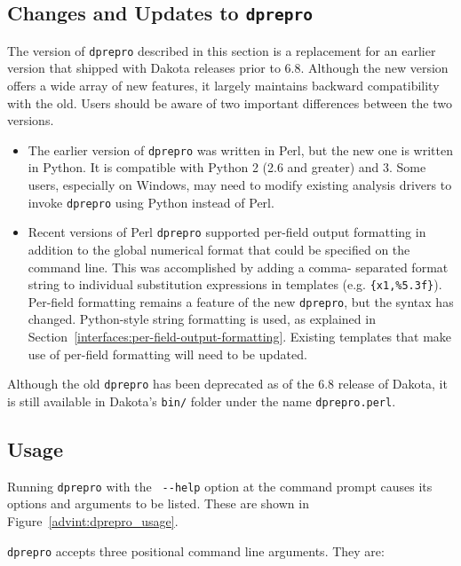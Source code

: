 {\subsection{Changes and Updates to \texttt{dprepro}}\label{interfaces:dprepro-changes}

The version of \texttt{dprepro} described in this section is a replacement for 
an earlier version that shipped with Dakota releases prior to 6.8. Although
the new version offers a wide array of new features, it largely maintains 
backward compatibility with the old. Users should be aware of two important 
differences between the two versions.

\begin{itemize}
 \item The earlier version of \texttt{dprepro} was written in Perl, but the 
	 new one is written in Python. It is compatible with Python 2 (2.6 and 
	 greater) and 3. Some users, especially on Windows, may need to modify 
	 existing analysis drivers to invoke \texttt{dprepro} using Python instead of
	 Perl.
 \item  Recent versions of Perl \texttt{dprepro} supported per-field output
	 formatting in addition to the global numerical format that could be 
	 specified on the command line. This was accomplished by adding a comma-
	 separated format string to individual substitution expressions in 
	 templates (e.g. \texttt{\{x1,\%5.3f\}}). Per-field formatting remains
	 a feature of the new \texttt{dprepro}, but the syntax has changed. 
	 Python-style string formatting is used, as explained in 
	 Section~\ref{interfaces:per-field-output-formatting}. Existing
	 templates that make use of per-field formatting will need to
	 be updated.
\end{itemize}
Although the old \texttt{dprepro} has been deprecated as of the 6.8 release 
of Dakota, it is still available in Dakota's \texttt{bin/} folder under the name 
\texttt{dprepro.perl}.

\subsection{Usage}\label{interfaces:dprepro-usage}

Running \texttt{dprepro} with the \texttt{ -\/-help} option at the command prompt 
causes its options and arguments to be listed. These are shown in 
Figure~\ref{advint:dprepro_usage}.

\texttt{dprepro} accepts three positional command line arguments. They are:

}
